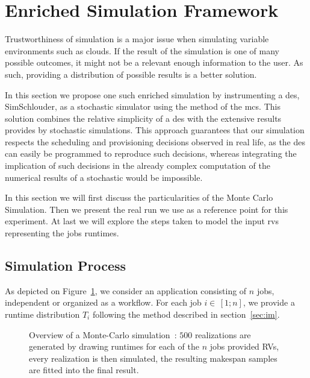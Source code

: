 \documentclass[10pt,conference,compsocconf]{IEEEtran}
\begin{document}
\section{Enriched Simulation Framework}
\label{sec:enriched-sim}

Trustworthiness of simulation is a major issue when simulating variable
environments such as clouds. If the result of the simulation is one of many
possible outcomes, it might not be a relevant enough information to the user. 
As such, providing a distribution of possible results is a better solution.

In this section we propose one such enriched simulation by instrumenting a
\ac{des}, SimSchlouder, as a stochastic simulator using the method of the
\acf{mcs}. This solution combines the relative simplicity of a \ac{des} with the
extensive results provides by stochastic simulations. This approach guarantees
that our simulation respects the scheduling and provisioning decisions observed
in real life, as the \ac{des} can easily be programmed to reproduce such
decisions, whereas integrating the implication of such decisions in the already
complex computation of the numerical results of a stochastic would be
impossible.

In this section we will first discuss the particularities of the Monte Carlo
Simulation. Then we present the real run we use as a reference point for this
experiment. At last we will explore the steps taken to model the
input \acp{rv} representing the jobs runtimes.

\subsection{Simulation Process}
As  depicted   on  Figure~\ref{fig:mc-process},  we  consider   an  application
consisting of  $n$ jobs, independent  or organized as  a workflow. For  each job
$i  \in\,[1;n]$, we provide  a runtime distribution $T_i$ following the method
described in section~\ref{sec:im}.

\begin{figure}
	\centering
	\resizebox{0.5\textwidth}{!}{%
		
		}
\caption{Overview of a Monte-Carlo simulation~: $500$ realizations are generated
by drawing runtimes for each of the $n$ jobs provided RVs, every realization is
then simulated, the resulting makespan samples are fitted into the final
result.}\label{fig:mc-process}
\end{figure}
\end{document}
